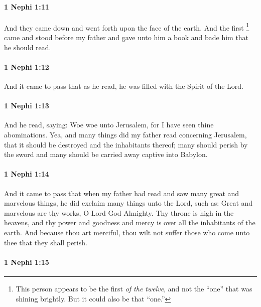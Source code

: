 		\paragraph{1 Nephi 1:11} %
			\label{1NEPHI-1-11}

			And they came down and went forth upon the face of the earth.
			And the first%
				\footnote{%
					This person appears to be the first \textit{of the twelve}, and not the ``one'' that was shining brightly. But it could also be that ``one.''
					}
			came and stood before my father
			and gave unto him a book and bade him that he should read.

		\paragraph{1 Nephi 1:12} %
			\label{1NEPHI-1-12}

			And it came to pass that as he read,
			he was filled with the Spirit of the Lord.

		\paragraph{1 Nephi 1:13} %
			\label{1NEPHI-1-13}

			And he read, saying: Woe woe unto Jerusalem,
			for I have seen thine abominations.
			Yea, and many things did my father read concerning Jerusalem,
			that it should be destroyed and the inhabitants thereof;
			many should perish by the sword
			and many should be carried away captive into Babylon.

		\paragraph{1 Nephi 1:14} %
			\label{1NEPHI-1-14}

			And it came to pass that when my father had read
			and saw many great and marvelous things,
			he did exclaim many things unto the Lord, such as:
			Great and marvelous are thy works, O Lord God Almighty.
			Thy throne is high in the heavens,
			and thy power and goodness and mercy is over all the inhabitants of the earth.
			And because thou art merciful,
			thou wilt not suffer those who come unto thee that they shall perish.

		\paragraph{1 Nephi 1:15} %
			\label{1NEPHI-1-15}

